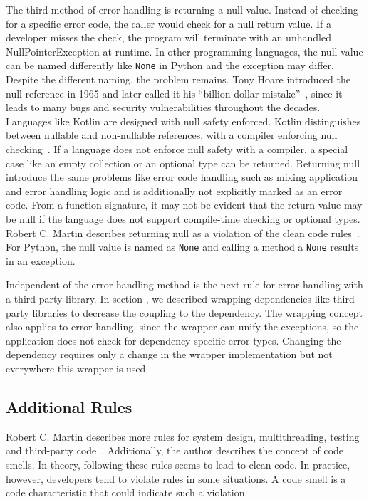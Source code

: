 The third method of error handling is returning a null value. Instead of checking for a specific error code, the caller would check for a null return value. If a developer misses the check, the program will terminate with an unhandled NullPointerException at runtime. In other programming languages, the null value can be named differently like \texttt{None} in Python and the exception may differ. Despite the different naming, the problem remains. Tony Hoare introduced the null reference in 1965 and later called it his \enquote{billion-dollar mistake}~\cite{hoare_null_2009}, since it leads to many bugs and security vulnerabilities throughout the decades. Languages like Kotlin are designed with null safety enforced. Kotlin distinguishes between nullable and non-nullable references, with a compiler enforcing null checking~\cite{noauthor_null_nodate}. If a language does not enforce null safety with a compiler, a special case like an empty collection or an optional type can be returned. 
Returning null introduce the same problems like error code handling such as mixing application and error handling logic and is additionally not explicitly marked as an error code. From a function signature, it may not be evident that the return value may be null if the language does not support compile-time checking or optional types. Robert C. Martin describes returning null as a violation of the clean code rules~\cite{martin_clean_2009}. For Python, the null value is named as \texttt{None} and calling a method a \texttt{None} results in an exception. 

Independent of the error handling method is the next rule for error handling with a third-party library. In section , we described wrapping dependencies like third-party libraries to decrease the coupling to the dependency. The wrapping concept also applies to error handling, since the wrapper can unify the exceptions, so the application does not check for dependency-specific error types. Changing the dependency requires only a change in the wrapper implementation but not everywhere this wrapper is used. 

\subsection{Additional Rules}
Robert C. Martin describes more rules for system design, multithreading, testing and third-party code~\cite{martin_clean_2009}. 
Additionally, the author describes the concept of code smells. In theory, following these rules seems to lead to clean code. In practice, however, developers tend to violate rules in some situations. A code smell is a code characteristic that could indicate such a violation.

